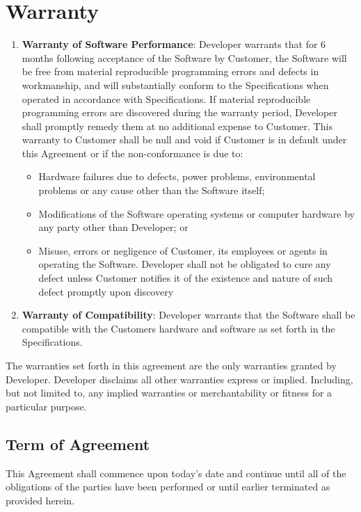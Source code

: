\documentclass[11pt]{article}
\begin{document}
\section{Warranty}
\begin{enumerate}
\renewcommand{\labelenumi}{(\Alph{enumi})}
\item {\bf Warranty of Software Performance}: Developer warrants that for 6 months following acceptance of the Software by Customer, the Software will be free from material reproducible programming errors and defects in workmanship, and will substantially conform to the Specifications when operated in accordance with Specifications. If material reproducible programming errors are discovered during the warranty period, Developer shall promptly remedy them at no additional expense to Customer. This warranty to Customer shall be null and void if Customer is in default under this Agreement or if the non-conformance is due to:
\begin{itemize}
\item Hardware failures due to defects, power problems, environmental problems or any cause other than the Software itself;
\item Modifications of the Software operating systems or computer hardware by any party other than Developer; or
\item Misuse, errors or negligence of Customer, its employees or agents in operating the Software. Developer shall not be obligated to cure any defect unless Customer notifies it of the existence and nature of such defect promptly upon discovery
\end{itemize}
\item {\bf  Warranty of Compatibility}: Developer warrants that the Software shall be compatible with the Customers hardware and software as set forth in the Specifications. 
\end{enumerate}
The warranties set forth in this agreement are the only warranties granted by Developer. Developer disclaims all other warranties express or implied. Including, but not limited to, any implied warranties or merchantability or fitness for a particular purpose.
\subsection{Term of Agreement}
This Agreement shall commence upon today’s date and continue until all of the obligations of the parties have been performed or until earlier terminated as provided herein.
\end{document}
